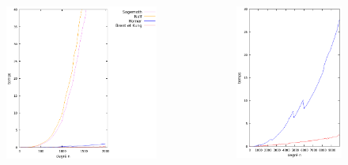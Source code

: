 \documentclass[10pt,a4paper]{beamer}
\begin{document}
\begin{frame}
    \begin{columns}
            \begin{figure}
            \includegraphics[scale=0.3, center]{comp.png}
            \end{figure}
            \begin{figure}
            \includegraphics[scale=0.3, center]{comp_2.png}

\end{figure}
\end{columns}
\end{frame}
\end{document}
